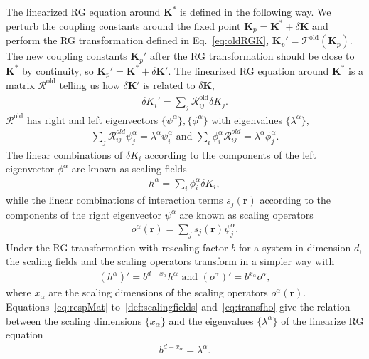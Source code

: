 \documentclass[aps,prb,reprint,superscriptaddress,floatfix]{revtex4-2}
\begin{document}
The linearized RG equation around $\mathbf{K}^{*}$ is defined in the following way.
We perturb the coupling constants around the fixed point $\mathbf{K}_p = \mathbf{K}^{*} + \delta \mathbf{K}$ and perform the RG transformation defined in Eq.~\eqref{eq:oldRGK}, $\mathbf{K}_p' = \mathcal{T}^{\text{old}}\left(\mathbf{K}_p\right)$. 
The new coupling constants $\mathbf{K}_p'$ after the RG transformation should be close to $\mathbf{K}^{*}$ by continuity, so $\mathbf{K}_p' = \mathbf{K}^{*} + \delta \mathbf{K}'$.
The linearized RG equation around $\mathbf{K}^{*}$ is a matrix $\mathcal{R}^{\text{old}}$ telling us how $\delta \mathbf{K}'$ is related to $\delta \mathbf{K}$,
%
\begin{align}\label{eq:respMat}
    \delta K_i' = \sum_j\mathcal{R}^{\text{old}}_{ij} \delta K_j.
\end{align}
%
$\mathcal{R}^{\text{old}}$ has right and left eigenvectors $\{\psi^{\alpha}\}, \{\phi^{\alpha}\}$ with eigenvalues $\{\lambda^{\alpha}\}$,
%
\begin{align}\label{eq:eigsofRespM}
    \sum_j \mathcal{R}^{old}_{ij} \psi^{\alpha}_j = \lambda^{\alpha}
    \psi^{\alpha}_i \text{ and } \sum_i \phi^{\alpha}_i
    \mathcal{R}^{old}_{ij} = \lambda^{\alpha} \phi^{\alpha}_j.
\end{align}
%
The linear combinations of $\delta K_i$ according to the components of the left eigenvector $\phi^{\alpha}$ are known as scaling fields
%
\begin{align}\label{def:scalingfields}
    h^{\alpha} = \sum_i \phi^{\alpha}_i \delta K_i,
\end{align}
%
while the linear combinations of interaction terms $s_j(\mathbf{r})$ according to the components of the right eigenvector $\psi^{\alpha}$ are known as scaling operators
%
\begin{align}\label{def:scalingOpt}
    o^{\alpha}(\mathbf{r}) = \sum_j s_j(\mathbf{r}) \psi^{\alpha}_j.
\end{align}
%
Under the RG transformation with rescaling factor $b$ for a system in dimension $d$, the scaling fields and the scaling operators transform in a simpler way with 
%
\begin{align}\label{eq:transfho}
    \left(h^{\alpha} \right)' = b^{d - x_{\alpha}} h^{\alpha} \text{ and }
    \left(o^{\alpha}\right)' = b^{x_{\alpha}} o^{\alpha},
\end{align}
where $x_{\alpha}$ are the scaling dimensions of the scaling operators $o^{\alpha}(\mathbf{r})$. 
Equations~\eqref{eq:respMat} to~\eqref{def:scalingfields} and~\eqref{eq:transfho} give the relation between the scaling dimensions $\{x_{\alpha}\}$ and the eigenvalues $\{\lambda^{\alpha}\}$ of the linearize RG equation 
%
\begin{align}\label{eq:lambda2x}
    b^{d-x_{\alpha}} = \lambda^{\alpha}.
\end{align}
%
\end{document}
